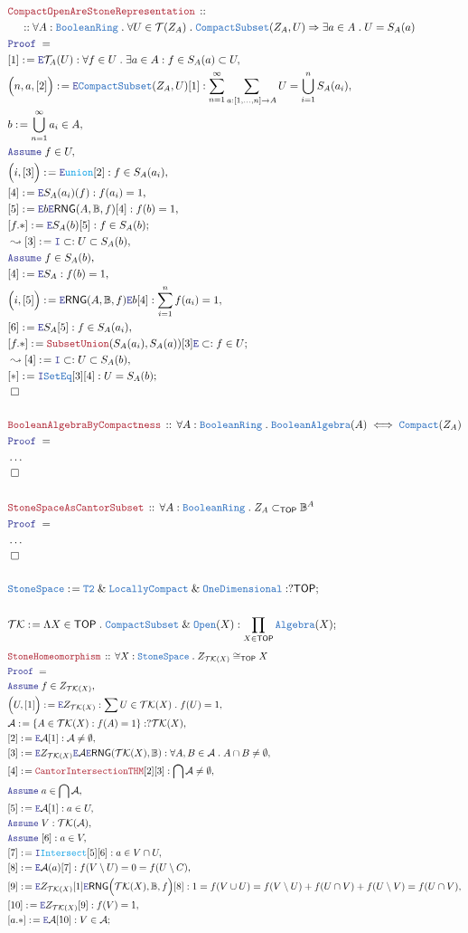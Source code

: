 \documentclass[12pt]{scrartcl}
\newcommand{\TYPE}[1]{\textcolor{NavyBlue}{\mathtt{#1}}}
\newcommand{\FUNC}[1]{\textcolor{Cerulean}{\mathtt{#1}}}
\newcommand{\LOGIC}[1]{\textcolor{Blue}{\mathtt{#1}}}
\newcommand{\THM}[1]{\textcolor{Maroon}{\mathtt{#1}}}
\renewcommand{\.}{\; . \;}
\newcommand{\de}{: \kern 0.1pc =}
\newcommand{\Theorem}[2]{& \THM{#1} \, :: \, #2 \\ & \Proof = \\ }
\newcommand{\NewLine}{\\ & \kern 1pc}
\newcommand{\Page}[1]{ \begin{align*} #1 \end{align*}   }
\newcommand{\NoProof}{ & \ldots \\ \EndProof}
\renewcommand{\And}{\; \& \;}
\newcommand{\Imply}{\Rightarrow}
\newcommand{\Intro}{\LOGIC{I}}
\newcommand{\Elim}{\LOGIC{E}}
\newcommand{\Say}[3]{& #1 \de #2 : #3, \\}
\newcommand{\SayIn}[3]{& #1 \de #2 \in #3, \\}
\newcommand{\Conclude}[3]{& #1 \de #2 : #3; \\}
\newcommand{\Derive}[3]{& \leadsto #1 \de #2 : #3, \\}
\newcommand{\Assume}[2]{& \LOGIC{Assume} \; #1 : #2, \\}
\newcommand{\AssumeIn}[2]{& \LOGIC{Assume} \; #1 \in #2, \\}
\newcommand{\QED}{\; \square}
\newcommand{\EndProof}{& \QED \\}
\newcommand{\Proof}{\LOGIC{Proof} \; }
\newcommand{\A}{\mathcal{A}}
\newcommand{\RNG}{\mathsf{RNG}}
\newcommand{\Compact}{\TYPE{Compact}}
\newcommand{\Compacts}{\TYPE{CompactSubset}}
\newcommand{\LCompact}{\TYPE{LocallyCompact}}
\newcommand{\TOP}{\mathsf{TOP}}
\newcommand{\T}{\mathcal{T}}
\newcommand{\Bool}{\mathbb{B}}
\newcommand{\Alg}{\TYPE{Algebra}}
\newcommand{\BR}{\TYPE{BooleanRing}}
\newcommand{\BA}{\TYPE{BooleanAlgebra}}
\renewcommand{\SS}{\TYPE{StoneSpace}}
\newcommand{\TK}{\mathcal{TK}}
\begin{document}
\Page{
	\Theorem{CompactOpenAreStoneRepresentation}
	{
		\NewLine ::
		\forall A : \BR \.
		\forall U \in \T(Z_A) \.
		\Compacts(Z_A,U)
		\Imply
		\exists a \in A \. U = S_A(a)
	}
	\Say{[1]}{\Elim \T_A(U)}
	{
		\forall f \in U \. 
		\exists a \in A :
		f \in S_A(a) \subset U
	}
	\Say{\Big(n,a,[2]\Big)}{\Elim \Compacts(Z_A,U)[1]}
	{
		\sum^\infty_{n=1} \sum_{a :[1,\ldots,n] \to A} U = \bigcup^n_{i=1} S_A(a_i)
	}
	\SayIn{b}{\bigcup^\infty_{n=1}a_i}{A}
	\AssumeIn{f}{U}
	\Say{\Big(i,[3]\Big)}{\Elim \FUNC{union}[2]}{f \in S_A(a_i)}
	\Say{[4]}{\Elim S_A(a_i)(f)}{f(a_i) = 1}
	\Say{[5]}{\Elim b\Elim \RNG(A,\Bool,f)[4]}{f(b) = 1}
	\Conclude{[f.*]}{\Elim S_A(b)[5]}{ f \in S_A(b)  }
	\Derive{[3]}{\Intro \subset}{U \subset S_A(b)}
	\AssumeIn{f}{S_A(b)}
	\Say{[4]}{\Elim S_A}{f(b) = 1}
	\Say{ \Big(i,[5] \Big) }{\Elim \RNG(A,\Bool,f)\Elim b[4]}{\sum^n_{i=1} f(a_i) = 1}
	\Say{[6]}{\Elim S_A [5]}{f \in S_A(a_i)}
	\Conclude{[f.*]}{\THM{SubsetUnion}(S_A(a_i),S_A(a))[3]\Elim \subset}{f \in U}
	\Derive{[4]}{\Intro \subset}{U \subset S_A(b)}
	\Conclude{[*]}{\Intro \TYPE{SetEq}[3][4]}{U =S_A(b)}
	\EndProof
	\\
	\Theorem{BooleanAlgebraByCompactness}
	{
		\forall A : \BR \.
		\BA(A) \iff \Compact(Z_A)
	}
	\NoProof
	\\
	\Theorem{StoneSpaceAsCantorSubset}
	{
		\forall A : \BR \.
		Z_A \subset_\TOP \Bool^A
	}
	\NoProof
	\\
	\Conclude{\SS}{\TYPE{T2} \And \LCompact \And \TYPE{OneDimensional}}{?\TOP}
	\\
	\Conclude{\TK}{\Lambda X \in \TOP \. \Compacts \And \TYPE{Open}(X) }{\prod_{X \in \TOP} \Alg(X)}
}\Page{
	\Theorem{StoneHomeomorphism}
	{
		\forall X : \SS \. 
		Z_{\TK(X)} \cong_\TOP X
	}
	\AssumeIn{f}{Z_{\TK(X)}}
	\Say{\Big(U,[1]\Big)}{\Elim Z_{\TK(X)}}
	{
		\sum U  \in \TK(X) \.  f(U) = 1
	}
	\Say{\A}{\{ A \in \TK(X) : f(A) = 1  \}}{?\TK(X)}
	\Say{[2]}{\Elim \A [1]}{\A \neq \emptyset}
	\Say{[3]}{\Elim Z_{\TK(X)} \Elim \A\Elim \RNG(\TK(X),\Bool)}
	{
		\forall A,B \in \A \. A \cap B \neq \emptyset
	}
	\Say{[4]}{\THM{CantorIntersectionTHM}[2][3]}{\bigcap \A \neq \emptyset}
	\AssumeIn{a}{\bigcap \A}
	\Say{[5]}{\Elim \A [1]}{a \in U}
	\Assume{V}{\TK(\A)}
	\Assume{[6]}{a \in V }
	\Say{[7]}{\Intro \FUNC{Intersect} [5][6]}{a \in V \cap U}
	\Say{[8]}{\Elim \A(a)[7]}{f(V \setminus U) = 0 = f(U \setminus C)}
	\Say{[9]}{\Elim Z_{\TK(X)}[1]\Elim \RNG\Big(\TK(X),\Bool,f\Big)[8]}
	{
		1 =
		f(V \cup U) =
		f(V \setminus U) + f(U\cap V) + f(U \setminus V) = 
		f(U \cap V)
	}
	\Say{[10]}{\Elim Z_{\TK(X)}[9]}{f(V) = 1}
	\Conclude{[a.*]}{\Elim \A [10]}{V \in \A}
}
\end{document}
